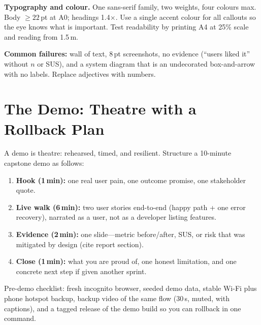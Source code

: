 \textbf{Typography and colour.} One sans-serif family, two weights, four colours max. Body $\ge 22$\,pt at A0; headings 1.4$\times$. Use a single accent colour for all callouts so the eye knows what is important. Test readability by printing A4 at 25\% scale and reading from 1.5\,m.

\textbf{Common failures:} wall of text, 8\,pt screenshots, no evidence (``users liked it'' without $n$ or SUS), and a system diagram that is an undecorated box-and-arrow with no labels. Replace adjectives with numbers.

\section{The Demo: Theatre with a Rollback Plan}
\label{sec:demo}

A demo is theatre: rehearsed, timed, and resilient. Structure a 10-minute capstone demo as follows:

\begin{enumerate}[leftmargin=*,itemsep=0.25em]
    \item \textbf{Hook (1\,min):} one real user pain, one outcome promise, one stakeholder quote.
    \item \textbf{Live walk (6\,min):} two user stories end-to-end (happy path + one error recovery), narrated as a user, not as a developer listing features.
    \item \textbf{Evidence (2\,min):} one slide---metric before/after, SUS, or risk that was mitigated by design (cite report section).
    \item \textbf{Close (1\,min):} what you are proud of, one honest limitation, and one concrete next step if given another sprint.
\end{enumerate}

Pre-demo checklist: fresh incognito browser, seeded demo data, stable Wi-Fi plus phone hotspot backup, backup video of the same flow (30\,s, muted, with captions), and a tagged release of the demo build so you can rollback in one command.

